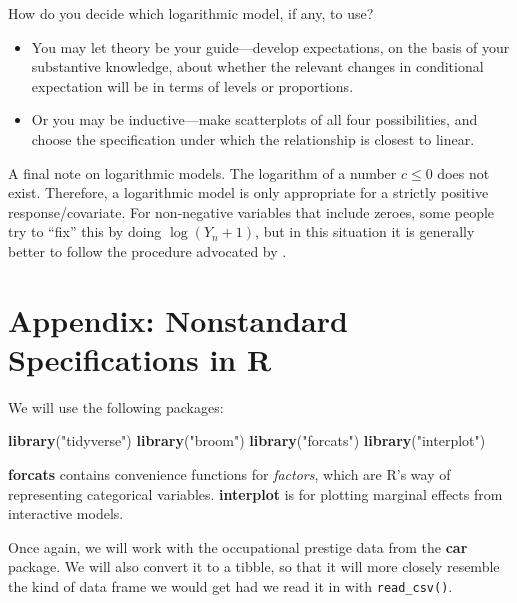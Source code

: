 \documentclass[
  12pt,
  oneside,openany]{book}
\newenvironment{Shaded}{\begin{snugshade}}{\end{snugshade}}
\newcommand{\KeywordTok}[1]{\textcolor[rgb]{0.13,0.29,0.53}{\textbf{#1}}}
\newcommand{\NormalTok}[1]{#1}
\newcommand{\StringTok}[1]{\textcolor[rgb]{0.31,0.60,0.02}{#1}}
\begin{document}
How do you decide which logarithmic model, if any, to use?

\begin{itemize}
\item
  You may let theory be your guide---develop expectations, on the basis of your substantive knowledge, about whether the relevant changes in conditional expectation will be in terms of levels or proportions.
\item
  Or you may be inductive---make scatterplots of all four possibilities, and choose the specification under which the relationship is closest to linear.
\end{itemize}

A final note on logarithmic models. The logarithm of a number \(c \leq 0\) does not exist. Therefore, a logarithmic model is only appropriate for a strictly positive response/covariate. For non-negative variables that include zeroes, some people try to ``fix'' this by doing \(\log(Y_n + 1)\), but in this situation it is generally better to follow the procedure advocated by \citet{burbidge1988alternative}.

\hypertarget{appendix-nonstandard-specifications-in-r}{%
\section{Appendix: Nonstandard Specifications in R}\label{appendix-nonstandard-specifications-in-r}}

We will use the following packages:

\begin{Shaded}
\begin{Highlighting}[]
\KeywordTok{library}\NormalTok{(}\StringTok{"tidyverse"}\NormalTok{)}
\KeywordTok{library}\NormalTok{(}\StringTok{"broom"}\NormalTok{)}
\KeywordTok{library}\NormalTok{(}\StringTok{"forcats"}\NormalTok{)}
\KeywordTok{library}\NormalTok{(}\StringTok{"interplot"}\NormalTok{)}
\end{Highlighting}
\end{Shaded}

\textbf{forcats} contains convenience functions for \emph{factors}, which are R's way of representing categorical variables. \textbf{interplot} is for plotting marginal effects from interactive models.

Once again, we will work with the occupational prestige data from the \textbf{car} package. We will also convert it to a tibble, so that it will more closely resemble the kind of data frame we would get had we read it in with \texttt{read\_csv()}.
\end{document}
